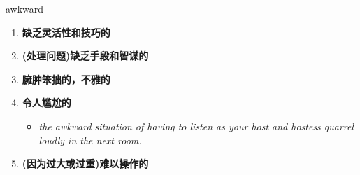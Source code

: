 
\begin{frame}
{\huge awkward}
\begin{center}
\begin{enumerate}\Large
  \item \textbf{缺乏灵活性和技巧的}
  \item \textbf{(处理问题)缺乏手段和智谋的}
  \item \textbf{臃肿笨拙的，不雅的}
  \item \textbf{令人尴尬的}
  \begin{itemize}
    \item \em{\Large{the awkward situation of having to listen as your host and hostess quarrel loudly in the next room.}}
  \end{itemize}
  \item \textbf{(因为过大或过重)难以操作的}
\end{enumerate}
\end{center}
\end{frame}
